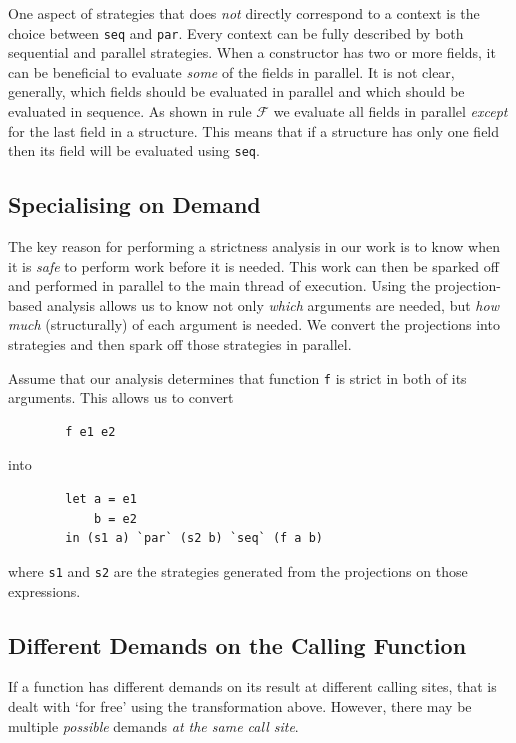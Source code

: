 One aspect of strategies that does \emph{not} directly correspond to a context
is the choice between \verb-seq- and \verb-par-. Every context can be fully
described by both sequential and parallel strategies. When a constructor has
two or more fields, it can be beneficial to evaluate \emph{some} of the fields
in parallel. It is not clear, generally, which fields should be evaluated in
parallel and which should be evaluated in sequence. As shown in rule $\mathcal{F}$
we evaluate all fields in parallel \emph{except} for the last field in a structure.
This means that if a structure has only one field then its field will be evaluated
using \verb-seq-.

\subsection{Specialising on Demand}

The key reason for performing a strictness analysis in our work is to know when
it is \emph{safe} to perform work before it is needed. This work can then be
sparked off and performed in parallel to the main thread of execution. Using
the projection-based analysis allows us to know not only \emph{which} arguments
are needed, but \emph{how much} (structurally) of each argument is needed. We
convert the projections into strategies and then spark off those strategies in
parallel.

Assume that our analysis determines that function \verb`f` is strict in both of
its arguments.  This allows us to convert

\begin{verbatim}
        f e1 e2
\end{verbatim}

into

\begin{verbatim}
        let a = e1
            b = e2
        in (s1 a) `par` (s2 b) `seq` (f a b)
\end{verbatim}

where \verb`s1` and \verb`s2` are the strategies generated from the projections on those
expressions.


\subsection*{Different Demands on the Calling Function}

If a function has different demands on its result at different calling sites,
that is dealt with `for free' using the transformation above. However, there
may be multiple \emph{possible} demands \emph{at the same call site}.

